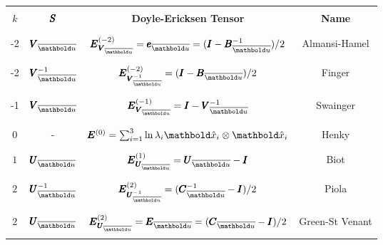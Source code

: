 \begin{table}[!htt]
\small
\centering
\begin{tabular}{|c|c|c|c|}
\hline
& & &\\
\textbf{   $k$   } & $\pmb{S}$  &\textbf{  Doyle-Ericksen Tensor    } & \textbf{   Name   } \\
& & & \\
\hline
& & & \\
-2 & $\tnr{V}_{\overline{\vto{u}}}$   & $\tnr{E}_{\tnr{V}_{\overline{\vto{u}}}}^{(-2)}=\tnr{e}_{\overline{\vto{u}}}=(\tnr{I} - \tnr{B}^{-1}_{\overline{\vto{u}}})/2$   & Almansi-Hamel\\
& & & \\
\hline
& & & \\
-2 & $\tnr{V}^{-1}_{\overline{\vto{u}}}$  & $\tnr{E}_{\tnr{V}^{-1}_{\overline{\vto{u}}}}^{(-2)}=(\tnr{I} - \tnr{B}_{\overline{\vto{u}}})/2$   & Finger\index{strain!Finger} \\
& & & \\
\hline
& & & \\
-1 & $\tnr{V}_{\overline{\vto{u}}}$  & $\tnr{E}_{\tnr{V}_{\overline{\vto{u}}}}^{(-1)}=\tnr{I} - \tnr{V}^{-1}_{\overline{\vto{u}}}$   & Swainger\index{strain!Swainger} \\
& & & \\
\hline
& & &\\
$0$ & - & $\tnr{E}^{(0)}=\sum_{i=1}^3\ln\lambda_i\vun{x}_{i}\otimes\vun{x}_{i}$   & Henky\index{strain!Henky} \\
& & &\\
\hline
& & &\\
$1$ &  $\tnr{U}_{\overline{\vto{u}}}$ &$\tnr{E}_{\tnr{U}_{\overline{\vto{u}}}}^{(1)}=\tnr{U}_{\overline{\vto{u}}}-\tnr{I}$ & Biot\index{Biot!tensor medida de} \\
& & &\\
\hline
& & & \\
$2$ & $\tnr{U}^{-1}_{\overline{\vto{u}}}$ & $\tnr{E}_{\tnr{U}^{-1}_{\overline{\vto{u}}}}^{(2)}=(\tnr{C}^{-1}_{\overline{\vto{u}}}-\tnr{I})/2$ & Piola\index{strain!Piola} \\
& & &\\
\hline
& & &\\
$2$ & $\tnr{U}_{\overline{\vto{u}}}$ & $\tnr{E}_{\tnr{U}_{\overline{\vto{u}}}}^{(2)}=\tnr{E}_{\overline{\vto{u}}}=(\tnr{C}_{\overline{\vto{u}}}-\tnr{I})/2$ & Green-St Venant\\
& & & \\
\hline
\end{tabular}
\vspace{9pt}
\label{tb:strains}
\end{table}

